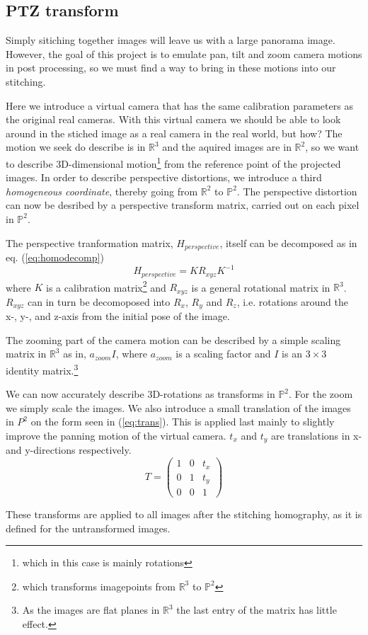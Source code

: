 \subsection{PTZ transform}
	Simply sitiching together images will leave us with a large panorama image. However, the goal of this project is to emulate pan, tilt and zoom camera motions in post processing, so we must find a way to bring in these motions into our stitching. 

	Here we introduce a virtual camera that has the same calibration parameters as the original real cameras. With this virtual camera we should be able to look around in the stiched image as a real camera in the real world, but how? The motion we seek do describe is in $\mathbb{R}^3$ and the aquired images are in $\mathbb{R}^2$, so we want to describe 3D-dimensional motion\footnote{which in this case is mainly rotations} from the reference point of the projected images. In order to describe perspective distortions, we introduce a third \emph{homogeneous coordinate}, thereby going from $\mathbb{R}^2$ to $\mathbb{P}^2$. The perspective distortion can now be desribed by a perspective transform matrix, carried out on each pixel in $\mathbb{P}^2$. \cite{hartley2003Multiple}

	The perspective tranformation matrix, $H_{perspective}$, itself can be decomposed as in eq. (\ref{eq:homodecomp}) 
	\begin{equation}
		H_{perspective}=KR_{xyz}K^{-1}
		\label{eq:homodecomp}
	\end{equation}
	where $K$ is a calibration matrix\footnote{which transforms imagepoints from $\mathbb{R}^3$ to $\mathbb{P}^2$} and $R_{xyz}$ is a general rotational matrix in $\mathbb{R}^3$. 
$R_{xyz}$ can in turn be decomoposed into $R_x$, $R_y$ and $R_z$, i.e. rotations around the x-, y-, and z-axis from the initial pose of the image.

	The zooming part of the camera motion can be described by a simple scaling matrix in $\mathbb{R}^3$ as in, $a_{zoom}I$, where $a_{zoom}$ is a scaling factor and $I$ is an $3 \times 3$ identity matrix.\footnote{As the images are flat planes in $\mathbb{R}^3$ the last entry of the matrix has little effect.}

	We can now accurately describe 3D-rotations as transforms in $\mathbb{P}^2$. For the zoom we simply scale the images. 
	We also introduce a small translation of the images in $P^2$ on the form seen in (\ref{eq:trans}). This is applied last mainly to slightly improve the panning motion of the virtual camera. $t_x$ and $t_y$ are translations in x- and y-directions respectively. 
\begin{equation}
	T=\begin{pmatrix}
		1 & 0 & t_x \\
		0 & 1 & t_y \\
		0 & 0 & 1
	\end{pmatrix}
	\label{eq:trans}
\end{equation}
	
These transforms are applied to all images after the stitching homography, as it is defined for the untransformed images.
